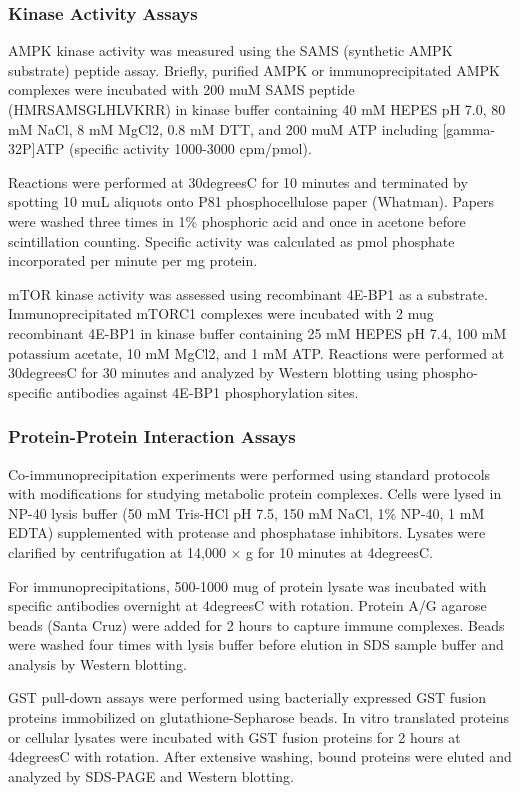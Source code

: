 \documentclass[11pt,a4paper]{article}
\begin{document}
\subsubsection{Kinase Activity Assays}

AMPK kinase activity was measured using the SAMS (synthetic AMPK substrate) peptide assay. Briefly, purified AMPK or immunoprecipitated AMPK complexes were incubated with 200 muM SAMS peptide (HMRSAMSGLHLVKRR) in kinase buffer containing 40 mM HEPES pH 7.0, 80 mM NaCl, 8 mM MgCl2, 0.8 mM DTT, and 200 muM ATP including [gamma-32P]ATP (specific activity 1000-3000 cpm/pmol).

Reactions were performed at 30degreesC for 10 minutes and terminated by spotting 10 muL aliquots onto P81 phosphocellulose paper (Whatman). Papers were washed three times in 1\% phosphoric acid and once in acetone before scintillation counting. Specific activity was calculated as pmol phosphate incorporated per minute per mg protein.

mTOR kinase activity was assessed using recombinant 4E-BP1 as a substrate. Immunoprecipitated mTORC1 complexes were incubated with 2 mug recombinant 4E-BP1 in kinase buffer containing 25 mM HEPES pH 7.4, 100 mM potassium acetate, 10 mM MgCl2, and 1 mM ATP. Reactions were performed at 30degreesC for 30 minutes and analyzed by Western blotting using phospho-specific antibodies against 4E-BP1 phosphorylation sites.

\subsubsection{Protein-Protein Interaction Assays}

Co-immunoprecipitation experiments were performed using standard protocols with modifications for studying metabolic protein complexes. Cells were lysed in NP-40 lysis buffer (50 mM Tris-HCl pH 7.5, 150 mM NaCl, 1\% NP-40, 1 mM EDTA) supplemented with protease and phosphatase inhibitors. Lysates were clarified by centrifugation at 14,000 × g for 10 minutes at 4degreesC.

For immunoprecipitations, 500-1000 mug of protein lysate was incubated with specific antibodies overnight at 4degreesC with rotation. Protein A/G agarose beads (Santa Cruz) were added for 2 hours to capture immune complexes. Beads were washed four times with lysis buffer before elution in SDS sample buffer and analysis by Western blotting.

GST pull-down assays were performed using bacterially expressed GST fusion proteins immobilized on glutathione-Sepharose beads. In vitro translated proteins or cellular lysates were incubated with GST fusion proteins for 2 hours at 4degreesC with rotation. After extensive washing, bound proteins were eluted and analyzed by SDS-PAGE and Western blotting.
\end{document}
